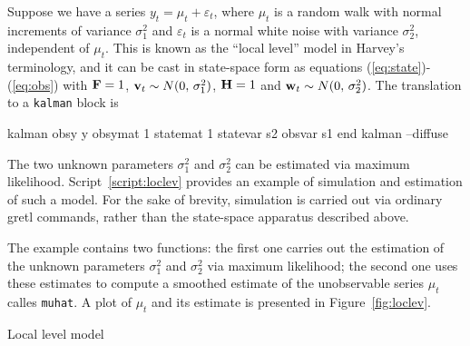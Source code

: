 Suppose we have a series $y_t = \mu_t + \varepsilon_t$, where $\mu_t$
is a random walk with normal increments of variance $\sigma^2_1$ and $
\varepsilon_t$ is a normal white noise with variance $\sigma^2_2$,
independent of $\mu_t$. This is known as the ``local level'' model in
Harvey's \citeyearpar{harvey89} terminology, and it can be cast in
state-space form as equations (\ref{eq:state})-(\ref{eq:obs}) with
$\mathbf{F} = 1$, $\mathbf{v}_t \sim N(0,\, \sigma^2_1)$, $\mathbf{H} = 1$
and $\mathbf{w}_t \sim N(0,\, \sigma^2_2)$.  The translation to a
\texttt{kalman} block is
\begin{code}
kalman
   obsy y
   obsymat 1
   statemat 1
   statevar s2
   obsvar s1
end kalman --diffuse
\end{code}

The two unknown parameters $\sigma^2_1$ and $\sigma^2_2$ can be
estimated via maximum likelihood.  Script~\ref{script:loclev} provides
an example of simulation and estimation of such a model. For the sake
of brevity, simulation is carried out via ordinary gretl commands,
rather than the state-space apparatus described above.

The example contains two functions: the first one carries out the
estimation of the unknown parameters $\sigma^2_1$ and $\sigma^2_2$ via
maximum likelihood; the second one uses these estimates to compute a
smoothed estimate of the unobservable series $\mu_t$ calles
\texttt{muhat}. A plot of $\mu_t$ and its estimate is presented in
Figure~\ref{fig:loclev}.

\begin{script}[htbp]
  \caption{Local level model}
  \label{script:loclev}
\end{script}

